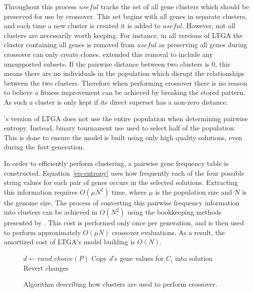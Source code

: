 \documentclass[twoside]{article}
\begin{document}
Throughout this process $useful$ tracks the set of all gene clusters which should be preserved for use by crossover.
This set begins with all genes in separate clusters, and each time a new cluster is created it is added to $useful$.
However, not all clusters are necessarily worth keeping. For instance, in all versions of LTGA the cluster
containing all genes is removed from $useful$ as preserving all genes during crossover can only create clones.
\cite{thierens:2013:ltgahiff} extended this removal to include any unsupported subsets. If the pairwise distance
between two clusters is 0, this means there are no individuals in the population which disrupt the relationships between the two
clusters. Therefore when performing crossover there is no reason to believe a fitness improvement can be achieved
by breaking the stored pattern. As such a cluster is only kept if its direct superset has a non-zero distance.

\cite{thierens:2013:ltgahiff}'s version of LTGA does not use the entire population when determining pairwise entropy.
Instead, binary tournament use used to select half of the population. This is done to ensure the model is built
using only high quality solutions, even during the first generation.

In order to efficiently perform clustering, a pairwise gene frequency table is constructed.
Equation~\ref{eq-entropy} uses how frequently each of the four possible string values for each
pair of genes occurs in the selected solutions. Extracting this information requires $O(\mu N^2)$
time, where $\mu$ is the population size and $N$ is the genome size. The process of converting
this pairwise frequency information into clusters can be achieved in $O(N^2)$ using the bookkeeping
methods presented by \cite{gronau:2007:upgma}. This cost is performed only once per generation,
and is then used to perform approximately $O(\mu N)$ crossover evaluations. As a result, the amortized cost of
LTGA's model building is $O(N)$.

\begin{figure}
  \begin{algorithmic}[1]
        \State $d \leftarrow rand\_choice(P)$\label{fig-cluster-usage-donate}
        \State Copy $d$'s gene values for $C_i$ into solution
            \State Revert changes
          \EndIf
        \EndIf
    \EndFor
  \EndProcedure
\end{algorithmic}
  \caption{Algorithm describing how clusters are used to perform crossover.}
  \label{fig-cluster-usage}
\end{figure}
\end{document}
